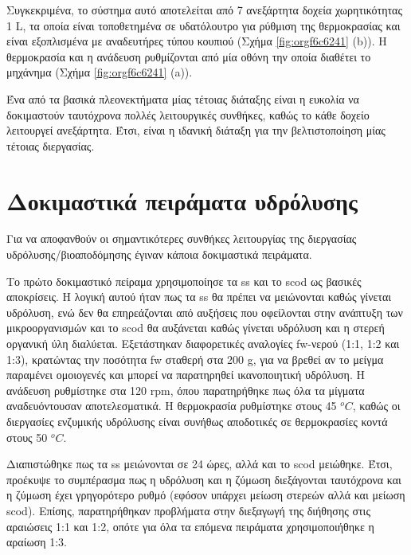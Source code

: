 \documentclass[11pt]{report}
\begin{document}
Συγκεκριμένα, το σύστημα αυτό αποτελείται από 7 ανεξάρτητα δοχεία χωρητικότητας 1 L, τα οποία είναι τοποθετημένα σε υδατόλουτρο για ρύθμιση της θερμοκρασίας και είναι εξοπλισμένα με αναδευτήρες τύπου κουπιού (Σχήμα \ref{fig:orgf6c6241} (b)). Η θερμοκρασία και η ανάδευση ρυθμίζονται από μία οθόνη την οποία διαθέτει το μηχάνημα (Σχήμα \ref{fig:orgf6c6241} (a)). 

Ένα από τα βασικά πλεονεκτήματα μίας τέτοιας διάταξης είναι η ευκολία να δοκιμαστούν ταυτόχρονα πολλές λειτουργικές συνθήκες, καθώς το κάθε δοχείο λειτουργεί ανεξάρτητα. Έτσι, είναι η ιδανική διάταξη για την βελτιστοποίηση μίας τέτοιας διεργασίας.

\section{Δοκιμαστικά πειράματα υδρόλυσης}
\label{sec:org418cbe3}
\label{sec:prep-hydro}

Για να αποφανθούν οι σημαντικότερες συνθήκες λειτουργίας της διεργασίας υδρόλυσης/βιοαποδόμησης έγιναν κάποια δοκιμαστικά πειράματα.

Το πρώτο δοκιμαστικό πείραμα χρησιμοποίησε τα \acrfull{ss} και το \acrfull{scod} ως βασικές αποκρίσεις. Η λογική αυτού ήταν πως τα \acrshort{ss} θα πρέπει να μειώνονται καθώς γίνεται υδρόλυση, ενώ δεν θα επηρεάζονται από αυξήσεις που οφείλονται στην ανάπτυξη των μικροοργανισμών και το \acrshort{scod} θα αυξάνεται καθώς γίνεται υδρόλυση και η στερεή οργανική ύλη διαλύεται. Εξετάστηκαν διαφορετικές αναλογίες \acrshort{fw}-νερού (1:1, 1:2 και 1:3), κρατώντας την ποσότητα \acrshort{fw} σταθερή στα 200 g, για να βρεθεί αν το μείγμα παραμένει ομοιογενές και μπορεί να παρατηρηθεί ικανοποιητική υδρόλυση. Η ανάδευση ρυθμίστηκε στα 120 rpm, όπου παρατηρήθηκε πως όλα τα μίγματα αναδευόντουσαν αποτελεσματικά. Η θερμοκρασία ρυθμίστηκε στους 45 \(^oC\), καθώς οι διεργασίες ενζυμικής υδρόλυσης είναι συνήθως αποδοτικές σε θερμοκρασίες κοντά στους 50 \(^oC\). 

Διαπιστώθηκε πως τα \acrfull{ss} μειώνονται σε 24 ώρες, αλλά και το \acrshort{scod} μειώθηκε. Έτσι, προέκυψε το συμπέρασμα πως η υδρόλυση και η ζύμωση διεξάγονται ταυτόχρονα και η ζύμωση έχει γρηγορότερο ρυθμό (εφόσον υπάρχει μείωση στερεών αλλά και μείωση \acrshort{scod}). Επίσης, παρατηρήθηκαν προβλήματα στην διεξαγωγή της διήθησης στις αραιώσεις 1:1 και 1:2, οπότε για όλα τα επόμενα πειράματα χρησιμοποιήθηκε η αραίωση 1:3.
\end{document}
